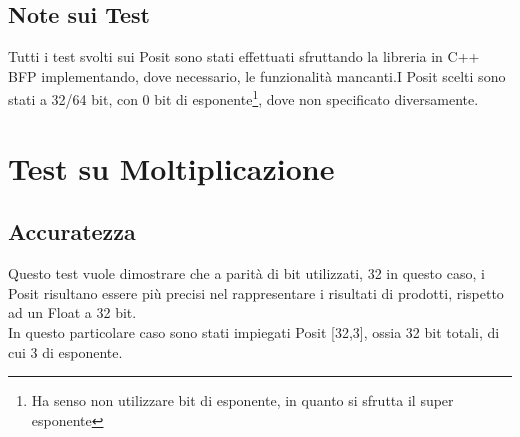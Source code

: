 \documentclass[a4paper,11pt]{article}
\begin{document}
	\subsection{Note sui Test}
	Tutti i test svolti sui Posit sono stati effettuati sfruttando la libreria in C++ BFP\cite{libbfp} 
	implementando, dove necessario, le funzionalità mancanti.\newline I Posit scelti sono stati a 32/64 bit, con 0 bit di esponente\footnote{Ha senso non utilizzare bit di esponente, in quanto si sfrutta il super esponente}, dove non specificato diversamente.
	
\newpage
\section {Test su Moltiplicazione}
\subsection{Accuratezza}

Questo test vuole dimostrare che a parità di bit utilizzati, 32 in questo caso, i Posit risultano essere più precisi nel rappresentare i risultati di prodotti, rispetto ad un Float a 32 bit.\\
In questo particolare caso sono stati impiegati Posit [32,3], ossia 32 bit totali, di cui 3 di esponente.
\end{document}
